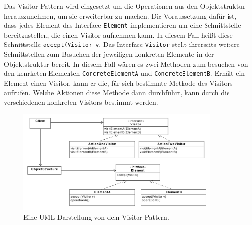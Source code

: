 
Das Visitor Pattern wird eingesetzt um die Operationen aus den Objektstruktur herauszunehmen, um sie erweiterbar zu machen. Die Voraussetzung dafür ist, dass jedes  Element  das Interface \texttt{Element} implementieren um eine Schnittstelle bereitzustellen, die einen Visitor aufnehmen kann. In diesem Fall heißt diese Schnittstelle \texttt{accept(Visitor v}. Das Interface \texttt{Visitor} stellt ihrerseits weitere Schnittstellen zum Besuchen der jeweiligen konkreten Elemente in der Objektstruktur bereit. In diesem Fall wären es zwei Methoden zum besuchen von den konrketen Elementen \texttt{ConcreteElementA} und \texttt{ConcreteElementB}. 
Erhält ein Element einen Visitor, kann er die, für sich bestimmte Methode des Visitors aufrufen. Welche Aktionen diese Methode dann durchführt, kann durch die verschiedenen konkreten Visitors bestimmt werden.

\begin{figure}[htbp]
\centering
\includegraphics[width=0.9\textwidth]{./paper/visitor/visitor}
\caption{Eine UML-Darstellung von dem Visitor-Pattern.}
\label{visitordiagramm}
\end{figure} 
